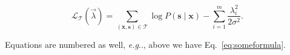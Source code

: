 \documentclass[twoside,a4paper,article]{combine}
\makeatletter
\DeclareRobustCommand\onedot{\futurelet\@let@token\@onedot}
\def\@onedot{\ifx\@let@token.\else.\null\fi\xspace}
\def\eg{\emph{e.g}\onedot} \def\Eg{\emph{E.g}\onedot}
\makeatother
\begin{document}
\begin{equation}
\label{eq:someformula}
\mathcal L_{\mathcal T}(\vec{\lambda})
    = \sum_{(\mathbf{x},\mathbf{s})\in \mathcal T}
       \log P(\mathbf{s}\mid\mathbf{x}) - \sum_{i=1}^m
       \frac{\lambda_i^2}{2\sigma^2}.
\end{equation}

Equations are numbered as well, \eg, above we have Eq.~\ref{eq:someformula}.



\end{document}
